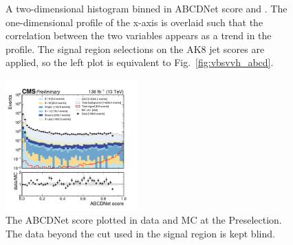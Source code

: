 \begin{figure}[htb]
    \centering
    \qquad
    \caption[A two-dimensional histogram binned in ABCDNet score and \detajj]{
        A two-dimensional histogram binned in ABCDNet score and \detajj. 
        The one-dimensional profile of the x-axis is overlaid such that the correlation between the two variables appears as a trend in the profile. 
        The signal region selections on the AK8 jet \ParticleNet scores are applied, so the left plot is equivalent to Fig.~\ref{fig:vbsvvh_abcd}.
    }
    \label{fig:vbsvvh_abcdnet_decorr}
\end{figure}

\begin{figure}[htb]
    \centering
    \includegraphics[width=0.45\textwidth]{fig/vbsvvh/abcdnet_score_data_vs_mc_log_presel.pdf}
    \caption[The ABCDNet score plotted in data and MC at the Preselection]{
        The ABCDNet score plotted in data and MC at the Preselection. 
        The data beyond the cut used in the signal region is kept blind. 
    }
    \label{fig:vbsvvh_abcdnet_score}
\end{figure}

